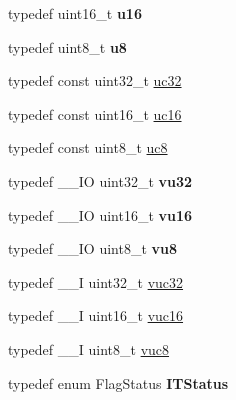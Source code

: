 \begin{DoxyCompactItemize}
\item 
\hypertarget{group___exported__types_gace9d960e74685e2cd84b36132dbbf8aa}{typedef uint16\-\_\-t {\bfseries u16}}\label{group___exported__types_gace9d960e74685e2cd84b36132dbbf8aa}

\item 
\hypertarget{group___exported__types_ga92c50087ca0e64fa93fc59402c55f8ca}{typedef uint8\-\_\-t {\bfseries u8}}\label{group___exported__types_ga92c50087ca0e64fa93fc59402c55f8ca}

\item 
typedef const uint32\-\_\-t \hyperlink{group___exported__types_ga5b628e6a05856ff67e535fa391a57683}{uc32}
\item 
typedef const uint16\-\_\-t \hyperlink{group___exported__types_gabc715ea3779494b5a4f53173a397f7cb}{uc16}
\item 
typedef const uint8\-\_\-t \hyperlink{group___exported__types_gac74022c74a461f810e0d4fdc9bfea480}{uc8}
\item 
\hypertarget{group___exported__types_ga0cd21c4793673b69ecd5fd673353a145}{typedef \-\_\-\-\_\-\-I\-O uint32\-\_\-t {\bfseries vu32}}\label{group___exported__types_ga0cd21c4793673b69ecd5fd673353a145}

\item 
\hypertarget{group___exported__types_ga93d1a6b3dcfdded10a7b15548679fe0a}{typedef \-\_\-\-\_\-\-I\-O uint16\-\_\-t {\bfseries vu16}}\label{group___exported__types_ga93d1a6b3dcfdded10a7b15548679fe0a}

\item 
\hypertarget{group___exported__types_ga4a8fa9a2b4796540a6d65a04eb18e111}{typedef \-\_\-\-\_\-\-I\-O uint8\-\_\-t {\bfseries vu8}}\label{group___exported__types_ga4a8fa9a2b4796540a6d65a04eb18e111}

\item 
typedef \-\_\-\-\_\-\-I uint32\-\_\-t \hyperlink{group___exported__types_ga2e08e321a35a55e72c5b3a507e76371f}{vuc32}
\item 
typedef \-\_\-\-\_\-\-I uint16\-\_\-t \hyperlink{group___exported__types_ga7f6037565f0caa27727c8b871daf0d56}{vuc16}
\item 
typedef \-\_\-\-\_\-\-I uint8\-\_\-t \hyperlink{group___exported__types_gab0ec90ac9b2c5864755998c8d37c264a}{vuc8}
\item 
\hypertarget{group___exported__types_gaacbd7ed539db0aacd973a0f6eca34074}{typedef enum Flag\-Status {\bfseries I\-T\-Status}}\label{group___exported__types_gaacbd7ed539db0aacd973a0f6eca34074}

\end{DoxyCompactItemize}
